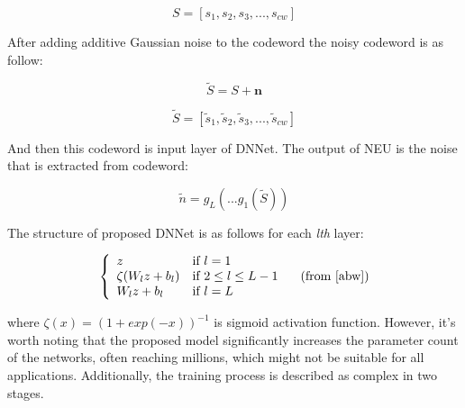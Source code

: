 \documentclass[lettersize,journal]{IEEEtran}
\begin{document}
\begin{equation}
		S=[s_{1},s_{2},s_{3},...,s_{cw}]
\end{equation}

After adding additive Gaussian noise to the codeword the noisy codeword is as follow:

\begin{equation}
		\tilde{S}=S+\textbf{n}
\end{equation}



\begin{equation}
		\tilde{S}=[\tilde{s}_{1},\tilde{s}_{2},\tilde{s}_{3},...,\tilde{s}_{cw}]
\end{equation}

And then this codeword is input layer of DNNet. The output of NEU is the noise that is extracted from codeword:

\begin{equation}
		\tilde{n}=g_{L}(...g_{1}(\tilde{S})) 
\end{equation}

The structure of proposed DNNet is as follows for each \textit{lth} 
layer:

\begin{equation}
\left\{
\begin{array}{ll}
	z  & \mbox{if } l=1 \\
	\zeta(W_{l}z+b_{l}) & \mbox{if } 2\le l \le L-1  \\
	W_{l}z+b_{l} & \mbox{if } l=L  
\end{array} 
\right.
	\label{eqn:dnnfunction}
	 \quad (\text{from \cite{abw}})
\end{equation}

where \begin{math}  \zeta(x)=(1+exp(-x))^{-1} \end{math} is sigmoid activation function.
However, it's worth noting that the proposed model significantly increases the parameter count of the networks, often reaching millions, which might not be suitable for all applications. Additionally, the training process is described as complex in two stages.
\end{document}
